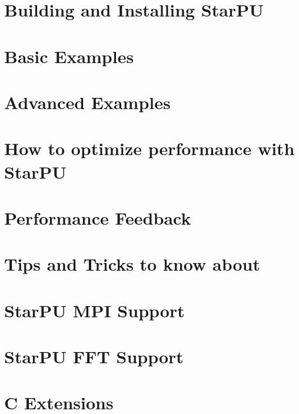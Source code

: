 \documentclass{book}
\begin{document}
\chapter{Building and Installing Star\-P\-U}
\label{buildingAndInstalling}
\hypertarget{buildingAndInstalling}{}


\chapter{Basic Examples}
\label{basicExamples}
\hypertarget{basicExamples}{}


\chapter{Advanced Examples}
\label{advancedExamples}
\hypertarget{advancedExamples}{}


\chapter{How to optimize performance with StarPU}
\label{optimizePerformance}
\hypertarget{optimizePerformance}{}


\chapter{Performance Feedback}
\label{performanceFeedback}
\hypertarget{performanceFeedback}{}


\chapter{Tips and Tricks to know about}
\label{tipsTricks}
\hypertarget{tipsTricks}{}


\chapter{StarPU MPI Support}
\label{mpiSupport}
\hypertarget{mpiSupport}{}


\chapter{StarPU FFT Support}
\label{fftSupport}
\hypertarget{fftSupport}{}


\chapter{C Extensions}
\label{cExtensions}
\hypertarget{cExtensions}{}

\end{document}
